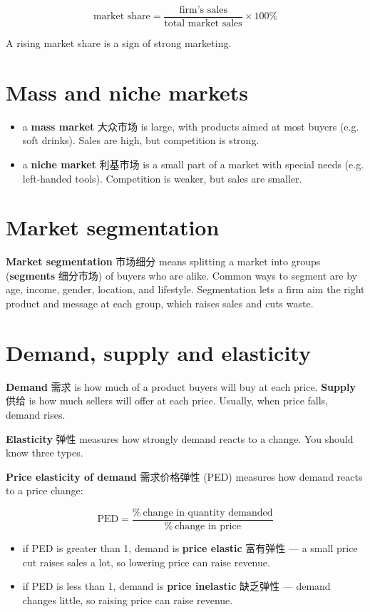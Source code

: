 \documentclass[11pt]{article}
\begin{document}
\[
\text{market share} = \frac{\text{firm's sales}}{\text{total market sales}} \times 100\%
\]

A rising market share is a sign of strong marketing.

\section*{Mass and niche markets}

\begin{itemize}
\item a \textbf{mass market} 大众市场 is large, with products aimed at most buyers (e.g. soft drinks). Sales are high, but competition is strong.

\item a \textbf{niche market} 利基市场 is a small part of a market with special needs (e.g. left-handed tools). Competition is weaker, but sales are smaller.

\end{itemize}

\section*{Market segmentation}

\textbf{Market segmentation} 市场细分 means splitting a market into groups (\textbf{segments} 细分市场) of buyers who are alike. Common ways to segment are by age, income, gender, location, and lifestyle. Segmentation lets a firm aim the right product and message at each group, which raises sales and cuts waste.

\section*{Demand, supply and elasticity}

\textbf{Demand} 需求 is how much of a product buyers will buy at each price. \textbf{Supply} 供给 is how much sellers will offer at each price. Usually, when price falls, demand rises.

\textbf{Elasticity} 弹性 measures how strongly demand reacts to a change. You should know three types.

\textbf{Price elasticity of demand} 需求价格弹性 (PED) measures how demand reacts to a price change:

\[
\text{PED} = \frac{\%\ \text{change in quantity demanded}}{\%\ \text{change in price}}
\]

\begin{itemize}
\item if PED is greater than 1, demand is \textbf{price elastic} 富有弹性 — a small price cut raises sales a lot, so lowering price can raise revenue.

\item if PED is less than 1, demand is \textbf{price inelastic} 缺乏弹性 — demand changes little, so raising price can raise revenue.

\end{itemize}
\end{document}
